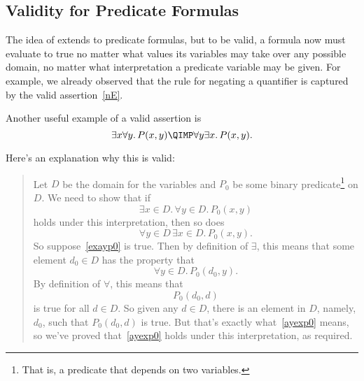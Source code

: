\iffalse
Logicians have worked very hard to define strict rules for the
use of logic notation so that ideas can be expressed with absolute rigor.
It's all quite charming and clever.  However, the sad irony is that
applied mathematicans usually use their beloved notation as a crude
shorthand, breaking the rules and abusing the notation willy-nilly---sort
of like pounding nails with fine china.
\fi

\subsection{Validity for Predicate Formulas}

\iffalse
A propositional formula is called \emph{valid} when it evaluates to \true\
no matter what truth values are assigned to the individual propositional
variables.  For example, the propositional version of the \idx{Distributive Law}
is that $P \QAND (Q \QOR R)$ is equivalent to $(P \QAND Q) \QOR (P \QAND
R)$.  This is the same as saying that
\[
[P \QAND (Q \QOR R)] \QIFF [(P \QAND Q) \QOR (P \QAND R)]
\]
is valid.
\fi

The idea of  extends to predicate formulas, but to be valid, a
formula now must evaluate to true no matter what values its variables
may take over any possible domain, no matter what interpretation a
predicate variable may be given.  For example, we already observed
that the rule for negating a quantifier is captured by the valid
assertion~\eqref{nE}.

Another useful example of a valid assertion is
\begin{equation}\label{eaimpliesae}
\exists x \forall y.\, P(x,y) \QIMP \forall y \exists x.\, P(x,y).
\end{equation}

Here's an explanation why this is valid:

\begin{quote}
Let $D$ be the domain for the variables and $P_0$ be some
binary predicate\footnote{That is, a predicate that depends on two variables.}
on $D$.  We need to show that if
\begin{equation}\label{exayp0}
\exists x \in D.\, \forall y \in D.\, P_0(x,y)
\end{equation}
holds under this interpretation, then so does
\begin{equation}\label{ayexp0}
\forall y \in D\, \exists x \in D.\, P_0(x,y).
\end{equation}
So suppose~\eqref{exayp0} is true.  Then by definition of $\exists$, this
means that some element $d_0 \in D$ has the property that
\[
\forall y \in D.\, P_0(d_0, y).
\]
By definition of $\forall$, this means that
\[
P_0(d_0,d)
\]
is true for all $d \in D$.  So given any $d \in D$, there is an element in
$D$, namely, $d_0$, such that $P_0(d_0,d)$ is true.  But that's exactly
what~\eqref{ayexp0} means, so we've proved that~\eqref{ayexp0} holds under
this interpretation, as required.
\end{quote}

